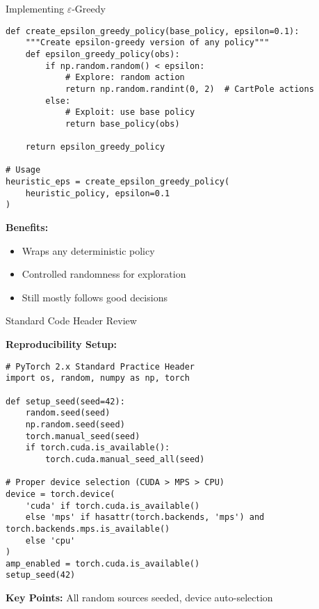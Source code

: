 \documentclass[aspectratio=169,10pt]{beamer}
\begin{document}
\begin{frame}[fragile]{Implementing $\varepsilon$-Greedy}

\begin{lstlisting}
def create_epsilon_greedy_policy(base_policy, epsilon=0.1):
    """Create epsilon-greedy version of any policy"""
    def epsilon_greedy_policy(obs):
        if np.random.random() < epsilon:
            # Explore: random action
            return np.random.randint(0, 2)  # CartPole actions
        else:
            # Exploit: use base policy
            return base_policy(obs)
    
    return epsilon_greedy_policy

# Usage
heuristic_eps = create_epsilon_greedy_policy(
    heuristic_policy, epsilon=0.1
)
\end{lstlisting}

\vfill

\textbf{Benefits:}
\begin{itemize}
    \item Wraps any deterministic policy
    \item Controlled randomness for exploration
    \item Still mostly follows good decisions
\end{itemize}

\end{frame}

\begin{frame}[fragile]{Standard Code Header Review}

\textbf{Reproducibility Setup:}

\begin{lstlisting}
# PyTorch 2.x Standard Practice Header
import os, random, numpy as np, torch

def setup_seed(seed=42):
    random.seed(seed)
    np.random.seed(seed)  
    torch.manual_seed(seed)
    if torch.cuda.is_available():
        torch.cuda.manual_seed_all(seed)

# Proper device selection (CUDA > MPS > CPU)
device = torch.device(
    'cuda' if torch.cuda.is_available() 
    else 'mps' if hasattr(torch.backends, 'mps') and torch.backends.mps.is_available()
    else 'cpu'
)
amp_enabled = torch.cuda.is_available()
setup_seed(42)
\end{lstlisting}

\textbf{Key Points:} All random sources seeded, device auto-selection

\end{frame}
\end{document}
